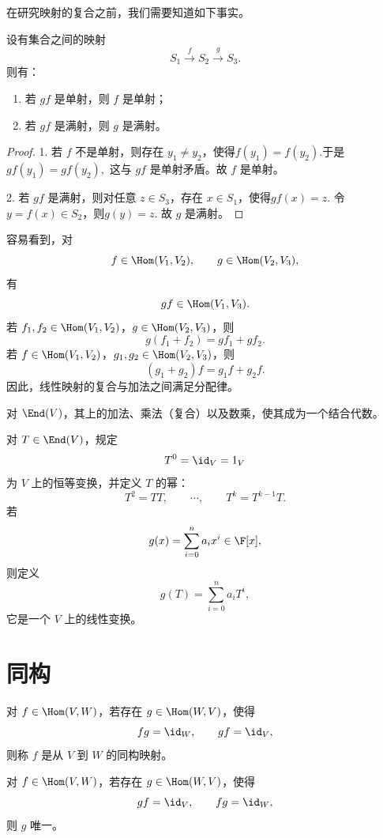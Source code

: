 在研究映射的复合之前，我们需要知道如下事实。

\begin{proposition}\label{4.6.4}
	设有集合之间的映射
	\[
	S_1\xrightarrow{\ f\ }S_2\xrightarrow{\ g\ }S_3.
	\]
	则有：
	\begin{enumerate}
		\item 若 $gf$ 是单射，则 $f$ 是单射；
		\item 若 $gf$ 是满射，则 $g$ 是满射。
	\end{enumerate}
\end{proposition}

\begin{proof}
	1. 若 $f$ 不是单射，则存在 $y_1\neq y_2$，使得$f(y_1)=f(y_2). $于是$gf(y_1)=gf(y_2), $
	这与 $gf$ 是单射矛盾。故 $f$ 是单射。
	
	2. 若 $gf$ 是满射，则对任意 $z\in S_3$，存在 $x\in S_1$，使得$gf(x)=z.$
	令 $y=f(x)\in S_2$，则$g(y)=z.$
	故 $g$ 是满射。
\end{proof}

容易看到，对
\[
f\in\Hom(V_1,V_2),
\qquad
g\in\Hom(V_2,V_3),
\]
有
\[
gf\in\Hom(V_1,V_3).
\]
若 $f_1,f_2\in\Hom(V_1,V_2)$，$g\in\Hom(V_2,V_3)$，则
\[
g(f_1+f_2)=gf_1+gf_2.
\]
若 $f\in\Hom(V_1,V_2)$，$g_1,g_2\in\Hom(V_2,V_3)$，则
\[
(g_1+g_2)f=g_1f+g_2f.
\]
因此，线性映射的复合与加法之间满足分配律。

\begin{proposition}
	对 $\End(V)$，其上的加法、乘法（复合）以及数乘，使其成为一个结合代数。
\end{proposition}

对 $T\in\End(V)$，规定
\[
T^0=\id_V=1_V
\]
为 $V$ 上的恒等变换，并定义 $T$ 的幂：
\[
T^2=TT,
\qquad
\cdots,
\qquad
T^k=T^{k-1}T.
\]
若
\[
g(x)=\sum_{i=0}^{n}a_i x^i\in\F[x],
\]
则定义
\[
g(T)=\sum_{i=0}^{n}a_iT^i,
\]
它是一个 $V$ 上的线性变换。
\section{同构}

\begin{definition}\label{p1:concept:c4-l1940}
	对 $f\in\Hom(V,W)$，若存在
	$g\in\Hom(W,V)$，使得
	\[
	fg=\id_{W},
	\qquad
	gf=\id_{V},
	\]
	则称 $f$ 是从 $V$ 到 $W$ 的同构映射。
\end{definition}

\begin{proposition}
	对 $f\in\Hom(V,W)$，若存在
	$g\in\Hom(W,V)$，使得
	\[
	gf=\id_{V},
	\qquad
	fg=\id_{W},
	\]
	则 $g$ 唯一。
\end{proposition}

